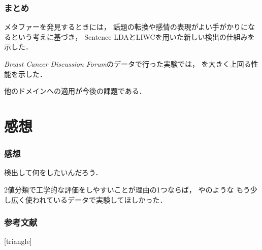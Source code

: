 \documentclass[11pt,usepdftitle=false]{beamer}
\newcommand\papertitle[1]{\textit{#1}}
\let\oldcite=\citet
\renewcommand\citet[1]{\hyperlink{#1}{\oldcite{#1}}}
\begin{document}
\begin{frame}
    \frametitle{まとめ}
    メタファーを発見するときには，
    話題の転換や感情の表現がよい手がかりになるという考えに基づき，
    Sentence LDAとLIWCを用いた新しい検出の仕組みを示した．

    \papertitle{Breast Cancer Discussion Forum}のデータで行った実験では，
    \citet{jang2015}を大きく上回る性能を示した．

    他のドメインへの適用が今後の課題である．
\end{frame}

\section{感想}
\begin{frame}
    \frametitle{感想}
    検出して何をしたいんだろう．

    2値分類で工学的な評価をしやすいことが理由の1つならば，
    \citet{steen2010}や\citet{tsvetkov2014}のような
    もう少し広く使われているデータで実験してほしかった．



\end{frame}

\begin{frame}[allowframebreaks]
\frametitle{参考文献}
    \scriptsize
    [triangle]
    
    
\end{frame}
\end{document}
